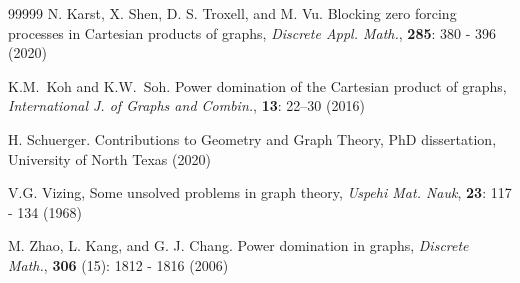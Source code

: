 \documentclass[11pt]{article}
\begin{document}
\begin{thebibliography}{99999}
 N. Karst, X. Shen, D. S. Troxell, and M. Vu. Blocking zero forcing processes in Cartesian products of graphs, \textit{Discrete Appl. Math.}, \textbf{285}: 380 - 396 (2020)

K.M.~Koh and K.W.~Soh. Power domination of the Cartesian product of graphs,  \textit{International J. of Graphs and Combin.}, {\bf 13}: 22--30 (2016)

 H. Schuerger. Contributions to Geometry and Graph Theory,  PhD dissertation, University of North Texas (2020)

 V.G. Vizing, Some unsolved problems in graph theory, \textit{Uspehi Mat. Nauk}, \textbf{23}: 117 - 134 (1968)


 M. Zhao, L. Kang, and G. J. Chang. Power domination in graphs, \textit{Discrete Math.}, \textbf{306} (15): 1812 - 1816 (2006)
\end{thebibliography}
\end{document}
